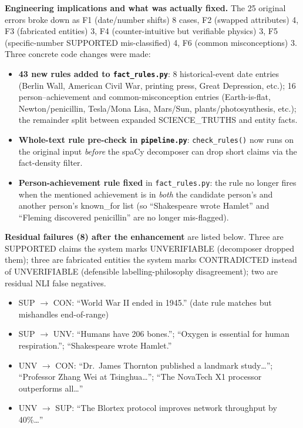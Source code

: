 \documentclass[12pt, a4paper, oneside]{report}
\begin{document}
\textbf{Engineering implications and what was actually fixed.} The 25 original errors broke down as F1 (date/number shifts) 8 cases, F2 (swapped attributes) 4, F3 (fabricated entities) 3, F4 (counter-intuitive but verifiable physics) 3, F5 (specific-number SUPPORTED mis-classified) 4, F6 (common misconceptions) 3. Three concrete code changes were made:
\begin{itemize}[nosep]
    \item \textbf{43 new rules added to \texttt{fact\_rules.py}}: 8 historical-event date entries (Berlin Wall, American Civil War, printing press, Great Depression, etc.); 16 person--achievement and common-misconception entries (Earth-is-flat, Newton/penicillin, Tesla/Mona Lisa, Mars/Sun, plants/photosynthesis, etc.); the remainder split between expanded SCIENCE\_TRUTHS and entity facts.
    \item \textbf{Whole-text rule pre-check in \texttt{pipeline.py}}: \texttt{check\_rules()} now runs on the original input \emph{before} the spaCy decomposer can drop short claims via the fact-density filter.
    \item \textbf{Person-achievement rule fixed} in \texttt{fact\_rules.py}: the rule no longer fires when the mentioned achievement is in \emph{both} the candidate person's and another person's known\_for list (so ``Shakespeare wrote Hamlet'' and ``Fleming discovered penicillin'' are no longer mis-flagged).
\end{itemize}

\textbf{Residual failures (8) after the enhancement} are listed below. Three are SUPPORTED claims the system marks UNVERIFIABLE (decomposer dropped them); three are fabricated entities the system marks CONTRADICTED instead of UNVERIFIABLE (defensible labelling-philosophy disagreement); two are residual NLI false negatives.

\begin{itemize}[nosep]
    \item SUP $\to$ CON: ``World War II ended in 1945.'' (date rule matches but mishandles end-of-range)
    \item SUP $\to$ UNV: ``Humans have 206 bones.''; ``Oxygen is essential for human respiration.''; ``Shakespeare wrote Hamlet.''
    \item UNV $\to$ CON: ``Dr.\ James Thornton published a landmark study\dots''; ``Professor Zhang Wei at Tsinghua\dots''; ``The NovaTech X1 processor outperforms all\dots''
    \item UNV $\to$ SUP: ``The Blortex protocol improves network throughput by 40\%\dots''
\end{itemize}
\end{document}
